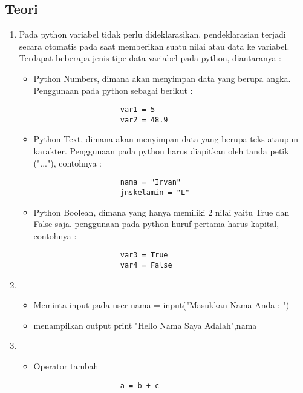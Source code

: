 
\subsection{Teori}
\begin{enumerate}
\item Pada python variabel tidak perlu dideklarasikan, pendeklarasian terjadi secara otomatis pada saat memberikan suatu nilai atau data ke variabel. Terdapat beberapa jenis tipe data variabel pada python, diantaranya :
				\begin{itemize}
\item Python Numbers, dimana akan menyimpan data yang berupa angka. Penggunaan pada python sebagai berikut : 
					\begin{lstlisting}
					var1 = 5
					var2 = 48.9
					\end{lstlisting}
	
\item Python Text, dimana akan menyimpan data yang berupa teks ataupun karakter. Penggunaan pada python harus diapitkan oleh tanda petik ("..."), contohnya :
					\begin{lstlisting}
					nama = "Irvan"
					jnskelamin = "L"
					\end{lstlisting}
					
\item Python Boolean, dimana yang hanya memiliki 2 nilai yaitu True dan False saja. penggunaan pada python huruf pertama harus kapital, contohnya :
					\begin{lstlisting}
					var3 = True
					var4 = False
					\end{lstlisting}
				\end{itemize}

			\item \begin{itemize}
					\item Meminta input pada user
					nama = input("Masukkan Nama Anda : ")
					
					\item menampilkan output
					print "Hello Nama Saya Adalah",nama
				\end{itemize}

			\item \begin{itemize}
					\item Operator tambah
					\begin{lstlisting}
					a = b + c
					\end{lstlisting}


\end{itemize}
\end{enumerate}
